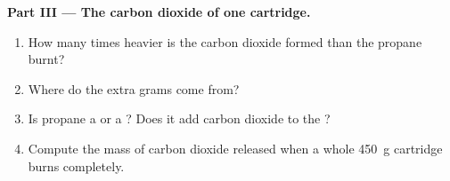 \begin{problem}
\medskip
\noindent\textbf{Part III --- The carbon dioxide of one cartridge.}
\begin{enumerate}[resume]
  \item How many times heavier is the carbon dioxide formed than the
        propane burnt?
  \item Where do the extra grams come from?
  \item Is propane a  or a ? Does  it add
        carbon dioxide to the ?
  \item Compute the mass of carbon dioxide released when a whole
        \qty{450}{g} cartridge burns completely.
\end{enumerate}
\end{problem}
